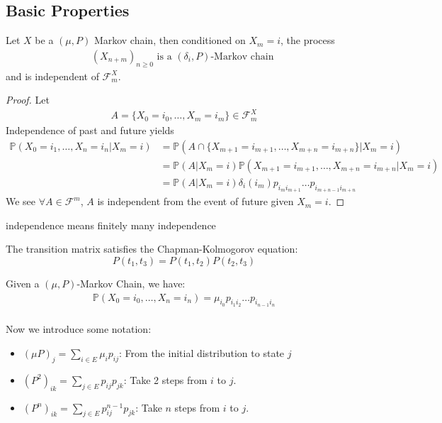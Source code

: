 \subsection{Basic Properties}
\begin{lemma}
	Let $X$ be a $(\mu, P)$ Markov chain, then conditioned on $X_m = i$, the process
	\begin{align*}
		(X_{n + m})_{n \geq 0} \text{ is a $(\delta_i, P)$-Markov chain }
	\end{align*}
	and is independent of $\mathcal{F}_m^X$.
\end{lemma}
\begin{proof}
	Let
	\begin{align*}
		A = \{X_0 = i_0, \dots, X_m = i_m\} \in \mathcal{F}_m^X
	\end{align*}
	Independence of past and future yields
	\begin{align*}
		\mathbb{P}(X_0= i_1, \dots, X_n = i_n| X_m = i) &= \mathbb{P}(A \cap \{X_{m+1} = i_{m+1}, \dots, X_{m+n} = i_{m+n}\}|X_m = i) \\
	&= \mathbb{P}(A|X_m = i)\mathbb{P}(X_{m+1} = i_{m+1}, \dots, X_{m+n} = i_{m+n}|X_m = i) \\
	&= \mathbb{P}(A|X_m = i) \delta_i(i_m) p_{i_m i_{m+1}} \dots p_{i_{m+n-1}i_{m+n}}
	\end{align*}
	We see $\forall A \in \mathcal{F}^m$, $A$ is independent from the event of future given $X_m = i$. 
\end{proof}
\begin{remark}
independence means finitely many independence
\end{remark}

\begin{theorem}
	The transition matrix satisfies the Chapman-Kolmogorov equation:
	\begin{equation*}
		P(t_1, t_3) = P(t_1, t_2) P(t_2, t_3)
	\end{equation*}
\end{theorem}
 Given a $(\mu, P)$-Markov Chain, we have:
 \begin{align*}
 	\mathbb{P}(X_0= i_0, \dots, X_n = i_n) = \mu_{i_0}p_{i_1i_2} \dots p_{i_{n-1}i_n}
 \end{align*}
\quad\\
Now we introduce some notation:
\begin{itemize}
	\item $(\mu P)_j = \sum_{i \in E}\mu_i p_{ij}$: From the initial distribution to state $j$
	\item $(P^2)_{ik} = \sum_{j \in E}p_{ij}p_{jk}$: Take 2 steps from $i$ to $j$. 
	\item $(P^n)_{ik} = \sum_{j \in E} p_{ij}^{n-1}  p_{jk}$: Take $n$ steps from $i$ to $j$.
\end{itemize}


